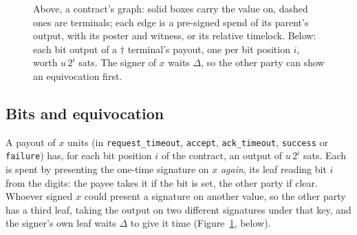 \documentclass[11pt]{article}
\theoremstyle{plain}
\theoremstyle{definition}
\newcommand{\bcorr}{b_{\mathrm{corr}}}
\newcommand{\tx}[1]{\texttt{#1}}
\newcommand{\Kb}{K_{b}^{c}}
\newcommand{\Kcorr}{K_{\mathrm{corr}}^{c}}
\begin{document}
\begin{figure}[!tbp]
\bigskip
{}
\caption{Above, a contract's graph: solid boxes carry the value on,
dashed ones are terminals; each edge is a pre-signed spend of its
parent's output, with its poster and witness, or its relative
timelock. Below: each bit output of a $\dagger$ terminal's payout, one
per bit position $i$, worth $u\,2^i$ sats. The signer of $x$ waits
$\Delta$, so the other party can show an equivocation first.}
\label{fig:graph}
\end{figure}

\subsection{Bits and equivocation}\label{sec:bits}

A payout of $x$ units (in \tx{request\_timeout}, \tx{accept},
\tx{ack\_timeout}, \tx{success} or \tx{failure}) has, for each bit
position $i$ of the contract, an output of $u\,2^i$ sats. Each is spent
by presenting the one-time signature on $x$ \emph{again}, its leaf
reading bit $i$ from the digits: the payee takes it if the bit is set,
the other party if clear. Whoever signed $x$ could present a signature
on another value, so the other party has a third leaf, taking the
output on two different signatures under that key, and the signer's own
leaf waits $\Delta$ to give it time (Figure~\ref{fig:graph}, below).
\end{document}
